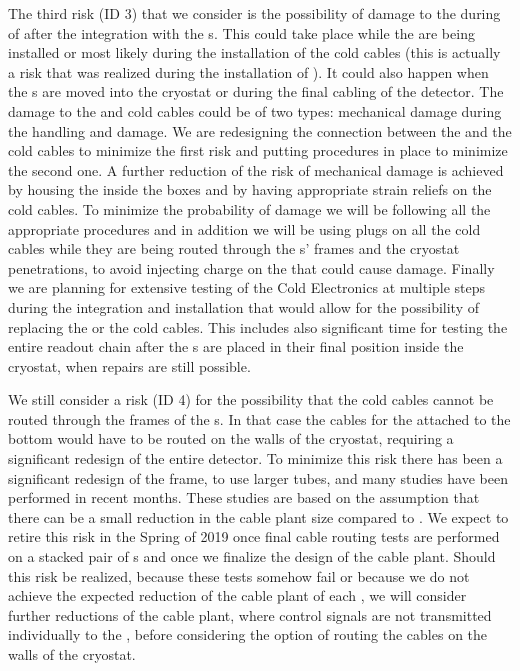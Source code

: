 The third risk (ID 3) that we consider is the possibility of damage to the 
 during of after the integration with the s. This could
take place while the  are being installed or most likely during the
installation of the cold cables (this is actually a risk that was realized during
the installation of ). It could also happen when the s are
moved into the cryostat or during the final cabling of the detector. The damage
to the  and cold cables could be of two types: mechanical damage during the
handling and  damage. We are redesigning the connection between the 
and the cold cables to minimize the first risk and putting procedures in place
to minimize the second one. A further reduction of the risk of mechanical damage
is achieved by housing the  inside the  boxes and by having 
appropriate strain reliefs on the cold cables. To minimize the probability of
 damage we will be following all the appropriate procedures and in addition
we will be using plugs on all the cold cables while they are being routed through the
s' frames and the cryostat penetrations, to avoid injecting charge on
the  that could cause  damage. Finally we are planning for
extensive testing of the Cold Electronics at multiple steps during the integration
and installation that would allow for the possibility of replacing the 
or the cold cables. This includes also significant time for testing the entire readout 
chain after the s are placed in their final position inside the cryostat,
when repairs are still possible.

We still consider a risk (ID 4) for the possibility that the cold cables cannot
be routed through the frames of the s. In that case the cables for the
 attached to the bottom  would have to be routed on the
walls of the cryostat, requiring a significant redesign of the entire detector. 
To minimize this risk there has been a significant redesign of the  frame, 
to use larger tubes, and many studies have been performed in recent months. 
These studies are based on the assumption that there can be a small reduction in
the cable plant size compared to . We expect to retire this risk
in the Spring of 2019 once final cable routing tests are performed on
a stacked pair of s and once we finalize the design of the  cable plant. Should
this risk be realized, because these tests somehow fail or because we do not 
achieve the expected reduction of the cable plant of each , we will 
consider further reductions of the cable plant, where control signals are not
transmitted individually to the , before considering the option of 
routing the cables on the walls of the cryostat.

